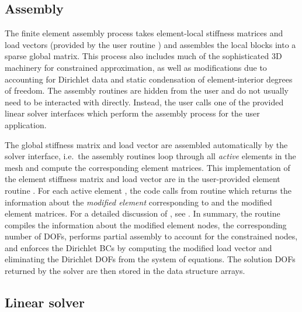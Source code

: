 \subsection{Assembly}

The finite element assembly process takes element-local stiffness matrices and load vectors (provided by the user routine ) and assembles the local blocks into a sparse global matrix. This process also includes much of the sophisticated \hp3D machinery for constrained approximation, as well as modifications due to accounting for Dirichlet data and static condensation of element-interior degrees of freedom. The assembly routines are hidden from the user and do not usually need to be interacted with directly. Instead, the user calls one of the provided linear solver interfaces which perform the assembly process for the user application.

The global stiffness matrix and load vector are assembled automatically by the solver interface, i.e.~the assembly routines loop through all {\em active} elements in the mesh and compute the corresponding element matrices. This implementation of the element stiffness matrix and load vector are in the user-provided element routine . For each active element , the code calls  from routine  which returns the information about the {\em modified element} corresponding to  and the modified element matrices. For a detailed discussion of , see \cite{hpbook,hpbook2}. In summary, the  routine compiles the information about the modified element nodes, the corresponding number of DOFs, performs partial assembly to account for the constrained nodes, and enforces the Dirichlet BCs by computing the modified load vector and eliminating the Dirichlet DOFs from the system of equations. The solution DOFs returned by the solver are then stored in the data structure arrays.

\subsection{Linear solver}

